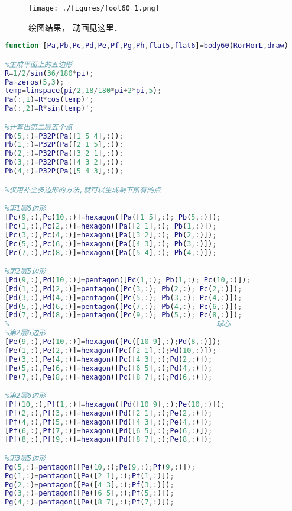 

\begin{figure}[ht]
\centering
\texttt{[image: ./figures/foot60\_1.png]}
\caption{绘图结果， 动画见这里．} \label{foot60_fig1}
\end{figure}

\begin{lstlisting}[language=matlab, caption=body60.m]
function [Pa,Pb,Pc,Pd,Pe,Pf,Pg,Ph,flat5,flat6]=body60(RorHorL,draw)

%生成平面上的五边形
R=1/2/sin(36/180*pi);
Pa=zeros(5,3); 
temp=linspace(pi/2,18/180*pi+2*pi,5);
Pa(:,1)=R*cos(temp)';
Pa(:,2)=R*sin(temp)';

%计算出第二层五个点
Pb(5,:)=P32P(Pa([1 5 4],:));
Pb(1,:)=P32P(Pa([2 1 5],:));
Pb(2,:)=P32P(Pa([3 2 1],:));
Pb(3,:)=P32P(Pa([4 3 2],:));
Pb(4,:)=P32P(Pa([5 4 3],:));

%仅用补全多边形的方法,就可以生成剩下所有的点

%第1层6边形
[Pc(9,:),Pc(10,:)]=hexagon([Pa([1 5],:); Pb(5,:)]);
[Pc(1,:),Pc(2,:)]=hexagon([Pa([2 1],:); Pb(1,:)]);
[Pc(3,:),Pc(4,:)]=hexagon([Pa([3 2],:); Pb(2,:)]);
[Pc(5,:),Pc(6,:)]=hexagon([Pa([4 3],:); Pb(3,:)]);
[Pc(7,:),Pc(8,:)]=hexagon([Pa([5 4],:); Pb(4,:)]);

%第2层5边形
[Pd(9,:),Pd(10,:)]=pentagon([Pc(1,:); Pb(1,:); Pc(10,:)]);
[Pd(1,:),Pd(2,:)]=pentagon([Pc(3,:); Pb(2,:); Pc(2,:)]);
[Pd(3,:),Pd(4,:)]=pentagon([Pc(5,:); Pb(3,:); Pc(4,:)]);
[Pd(5,:),Pd(6,:)]=pentagon([Pc(7,:); Pb(4,:); Pc(6,:)]);
[Pd(7,:),Pd(8,:)]=pentagon([Pc(9,:); Pb(5,:); Pc(8,:)]);
%-------------------------------------------------球心
%第2层6边形
[Pe(9,:),Pe(10,:)]=hexagon([Pc([10 9],:);Pd(8,:)]);
[Pe(1,:),Pe(2,:)]=hexagon([Pc([2 1],:);Pd(10,:)]);
[Pe(3,:),Pe(4,:)]=hexagon([Pc([4 3],:);Pd(2,:)]);
[Pe(5,:),Pe(6,:)]=hexagon([Pc([6 5],:);Pd(4,:)]);
[Pe(7,:),Pe(8,:)]=hexagon([Pc([8 7],:);Pd(6,:)]);

%第2层6边形
[Pf(10,:),Pf(1,:)]=hexagon([Pd([10 9],:);Pe(10,:)]);
[Pf(2,:),Pf(3,:)]=hexagon([Pd([2 1],:);Pe(2,:)]);
[Pf(4,:),Pf(5,:)]=hexagon([Pd([4 3],:);Pe(4,:)]);
[Pf(6,:),Pf(7,:)]=hexagon([Pd([6 5],:);Pe(6,:)]);
[Pf(8,:),Pf(9,:)]=hexagon([Pd([8 7],:);Pe(8,:)]);

%第3层5边形
Pg(5,:)=pentagon([Pe(10,:);Pe(9,:);Pf(9,:)]);
Pg(1,:)=pentagon([Pe([2 1],:);Pf(1,:)]);
Pg(2,:)=pentagon([Pe([4 3],:);Pf(3,:)]);
Pg(3,:)=pentagon([Pe([6 5],:);Pf(5,:)]);
Pg(4,:)=pentagon([Pe([8 7],:);Pf(7,:)]);


\end{lstlisting}
